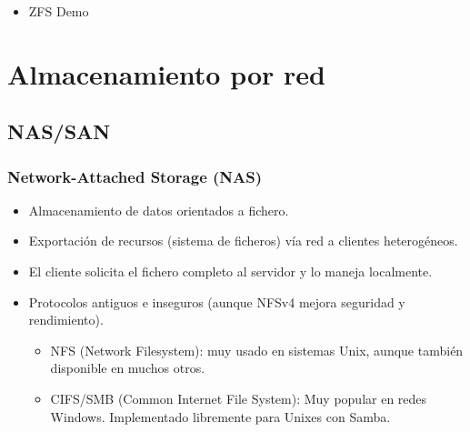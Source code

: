 \documentclass{beamer}
\begin{document}
\begin{frame}
  \frametitle{}
  \begin{itemize}
    \item ZFS Demo
  \end{itemize}
\end{frame}


\section{Almacenamiento por red}

\subsection{NAS/SAN}

\begin{frame}
  \frametitle{Network-Attached Storage (NAS)}
  \begin{itemize}
    \item Almacenamiento de datos \alert{orientados a fichero}.
    \item Exportación de recursos (sistema de ficheros) vía red a clientes heterogéneos.
    \item El cliente solicita el fichero completo al servidor y lo maneja localmente.
    \item Protocolos antiguos e inseguros (aunque NFSv4 mejora seguridad y rendimiento). 
	  \begin{itemize}
	    \item \alert{NFS} (Network Filesystem): muy usado en sistemas Unix, aunque también disponible en muchos otros. 
	    \item \alert{CIFS/SMB} (Common Internet File System): Muy popular en redes Windows. Implementado libremente para Unixes con \alert{Samba}.
	  \end{itemize}

  \end{itemize}
\end{frame}
\end{document}
